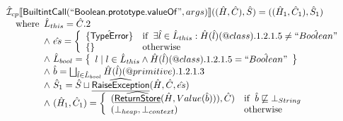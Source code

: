 \[\begin{array}{l}
\hat{\mathcal{I}} _{cp}\llbracket \mbox{\textsf{BuiltintCall}}(``\mbox{\textsf{Boolean.prototype.valueOf}}",args)\rrbracket((\hat{H},\hat{C}), \hat{S})
  = ((\hat{H}_1, \hat{C}_1), \hat{S}_1)\\
\quad{\rm where}\begin{array}[t]{l}
  \hat{L}_{this} = \hat{C}.2\\
  \land\ \hat{es} = \left\{\begin{array}{ll}
      \{\hat{\mbox{\textsf{TypeError}}}\} 
      & {\rm if}\begin{array}[t]{l}\exists \hat{l} \in \hat{L}_{this}:
          \hat{H}(\hat{l})(@class).1.2.1.5 \neq \hat{``Boolean"}\end{array}\\
      \left\{\begin{array}{l}\end{array}\right\} & {\rm otherwise}
    \end{array}\right.\\
  \land\ \hat{L}_{bool} = 
    \left\{\begin{array}{l} l \mid l \in \hat{L}_{this} \land  \hat{H}(\hat{l})(@class).1.2.1.5 = \hat{``Boolean"}\end{array}\right\}\\
  \land\ \hat{b} = \bigsqcup_{\hat{l} \in \hat{L}_{bool}} \hat{H}(\hat{l})(@primitive).1.2.1.3\\
  \land\ \hat{S}_1 = \hat{S} \sqcup \widehat{\underline{\sf RaiseException}}(\hat{H}, \hat{C}, \hat{es})\\
  \land\ (\hat{H}_1, \hat{C}_1) = 
    \left\{\begin{array}{ll}
      (\widehat{\underline{\sf ReturnStore}}(\hat{H}, Value(\hat{b}))), \hat{C})
      & {\rm if}\begin{array}[t]{l}\hat{b} \not\sqsubseteq \bot_{String}\end{array}\\
      (\bot_{heap}, \bot_{context}) & {\rm otherwise} \\
    \end{array}\right.\\
  \end{array}\\
\end{array}
\]


